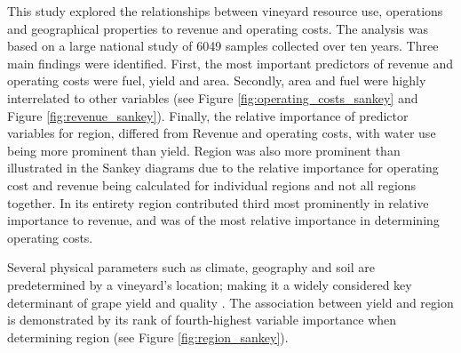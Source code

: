 \documentclass[review,12pt,authoryear]{elsarticle}
\begin{document}
\begin{linenumbers}
This study explored the relationships between vineyard resource use, operations and geographical properties to revenue and operating costs. The analysis was based on a large national study of 6049 samples collected over ten years. Three main findings were identified. First, the most important predictors of revenue and operating costs were fuel, yield and area. Secondly, area and fuel were highly interrelated to other variables (see Figure \ref{fig:operating_costs_sankey} and Figure \ref{fig:revenue_sankey}). Finally, the relative importance of predictor variables for region, differed from Revenue and operating costs, with water use being more prominent than yield. Region was also more prominent than illustrated in the Sankey diagrams due to the relative importance for operating cost and revenue being calculated for individual regions and not all regions together. In its entirety region contributed third most prominently in relative importance to revenue, and was of the most relative importance in determining operating costs.
\par
Several physical parameters such as climate, geography and soil are predetermined by a vineyard's location; making it a widely considered key determinant of grape yield and quality \citep{abbalDecisionSupportSystem2016,agostaRegionalClimateVariability2012,fragaMultivariateClusteringViticultural2017}.
The association between yield and region is demonstrated by its rank of fourth-highest variable importance when determining region (see Figure \ref{fig:region_sankey}).
\par

\end{linenumbers}
\end{document}
